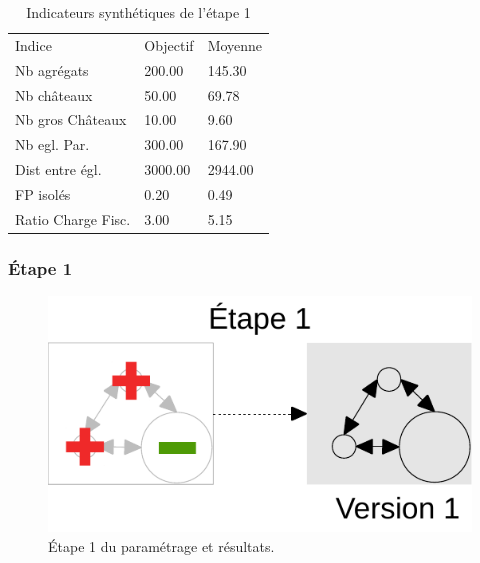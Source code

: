 	\begin{table}[H]
		\centering
		\caption{Indicateurs synthétiques de l'étape 1}
		\label{my-label}
		\begin{tabular}{lll}
			Indice             & Objectif & Moyenne \\
			Nb agrégats        & 200.00   & 145.30  \\
			Nb châteaux        & 50.00    & 69.78   \\
			Nb gros  Châteaux  & 10.00    & 9.60    \\
			Nb egl. Par.       & 300.00   & 167.90  \\
			Dist entre égl.    & 3000.00  & 2944.00 \\
			FP isolés          & 0.20     & 0.49    \\
			Ratio Charge Fisc. & 3.00     & 5.15   
		\end{tabular}
	\end{table}

\pagebreak
	\subsubsection{Étape 1}
		\begin{figure}[H]
			\centering
			\includegraphics[width = \linewidth, page = 1]{img/schemas_etapes_individuelles.pdf}
			\caption{Étape 1 du paramétrage et résultats.}
		\end{figure}

\pagebreak
